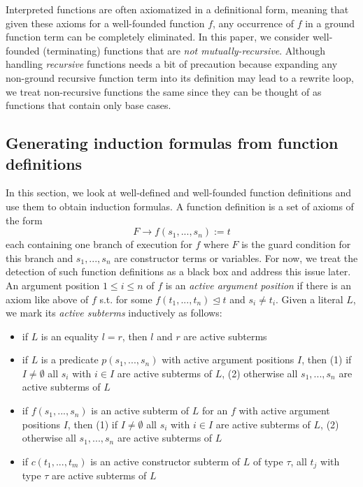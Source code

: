 
Interpreted functions are often axiomatized in a definitional form, meaning that given these axioms for a well-founded function $f$, any occurrence of $f$ in a ground function term can be completely eliminated. In this paper, we consider well-founded (terminating) functions that are \textit{not mutually-recursive}. Although handling \textit{recursive} functions needs a bit of precaution because expanding any non-ground recursive function term into its definition may lead to a rewrite loop, we treat non-recursive functions the same since they can be thought of as functions that contain only base cases.
\subsection{Generating induction formulas from function definitions}\label{sec:generating}
In this section, we look at well-defined and well-founded function definitions and use them to obtain induction formulas. A function definition is a set of axioms of the form
$$F\rightarrow f(s_1,...,s_n):=t$$
each containing one branch of execution for $f$ where $F$ is the guard condition for this branch and $s_1,...,s_n$ are constructor terms or variables. For now, we treat the detection of such function definitions as a black box and address this issue later. An argument position $1\le i\le n$ of $f$ is an \textit{active argument position} if there is an axiom like above of $f$ s.t. for some $f(t_1,...,t_n)\trianglelefteq t$ and $s_i\neq t_i$. Given a literal $L$, we mark its \textit{active subterms} inductively as follows:
\begin{itemize}
	\item if $L$ is an equality $l=r$, then $l$ and $r$ are active subterms
	\item if $L$ is a predicate $p(s_1,...,s_n)$ with active argument positions $I$, then (1) if $I\neq\emptyset$ all $s_i$ with $i\in I$ are active subterms of $L$, (2) otherwise all $s_1,...,s_n$ are active subterms of $L$
	\item if $f(s_1,...,s_n)$ is an active subterm of $L$ for an $f$ with active argument positions $I$, then (1) if $I\neq\emptyset$ all $s_i$ with $i\in I$ are active subterms of $L$, (2) otherwise all $s_1,...,s_n$ are active subterms of $L$
	\item if $c(t_1,...,t_m)$ is an active constructor subterm of $L$ of type $\tau$, all $t_j$ with type $\tau$ are active subterms of $L$
\end{itemize}

